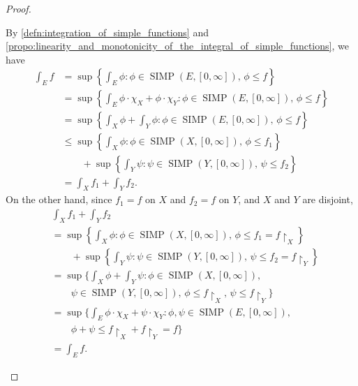 \documentclass[notoc,notitlepage]{tufte-book}
\DeclareMathOperator{\SIMP}{SIMP}
\begin{document}
\begin{proof}
\begin{enumerate}
        By
      \cref{defn:integration_of_simple_functions} and
      \cref{propo:linearity_and_monotonicity_of_the_integral_of_simple_functions},
      we have
      \begin{align*}
        \int_{E} f
        &= \sup \left\{ \int_{E} \phi : \phi \in \SIMP(E, [0, \infty]),\, \phi
          \leq f \right\} \\
        &= \sup \left\{ \int_{E} \phi \cdot \chi_X + \phi \cdot \chi_Y : \phi
          \in \SIMP(E, [0, \infty]),\, \phi \leq f \right\} \\
        &= \sup \left\{ \int_{X} \phi + \int_{Y} \phi : \phi \in \SIMP(E, [0,
          \infty]),\, \phi \leq f \right\} \\
        &\leq \sup \left\{ \int_{X} \phi : \phi \in \SIMP(X, [0, \infty]),\,
          \phi \leq f_1 \right\} \\
        &\qquad + \sup \left\{ \int_{Y} \psi : \psi \in \SIMP(Y, [0, \infty]),\,
          \psi \leq f_2 \right\} \\
        &= \int_{X} f_1 + \int_{Y} f_2.
      \end{align*}
      On the other hand, since $f_1 = f$ on $X$ and $f_2 = f$ on $Y$, and $X$ 
      and $Y$ are disjoint,
      \begin{align*}
        &\int_{X} f_1 + \int_{Y} f_2 \\
        &= \sup \left\{ \int_{X} \phi : \phi \in \SIMP(X, [0, \infty]),\,
          \phi \leq f_1 = f \restriction_X \right\} \\
        &\qquad + \sup \left\{ \int_{Y} \psi : \psi \in \SIMP(Y, [0, \infty]),\,
          \psi \leq f_2 = f \restriction_Y \right\} \\
        &= \sup \Bigg\{ \int_{X} \phi + \int_{Y} \psi : \phi \in \SIMP(X, [0,
          \infty]), \\
        &\qquad \psi \in \SIMP(Y, [0, \infty]),\, \phi \leq f
          \restriction_X,\, \psi \leq f \restriction_Y \Bigg\} \\
        &= \sup \Bigg\{ \int_{E} \phi \cdot \chi_X + \psi \cdot \chi_Y : \phi,
          \psi \in \SIMP(E, [0, \infty]), \\
        &\qquad \phi + \psi \leq f \restriction_X + f \restriction_Y = f \Bigg\}
        \\
        &= \int_{E} f.
      \end{align*}


\end{enumerate}
\end{proof}
\end{document}
